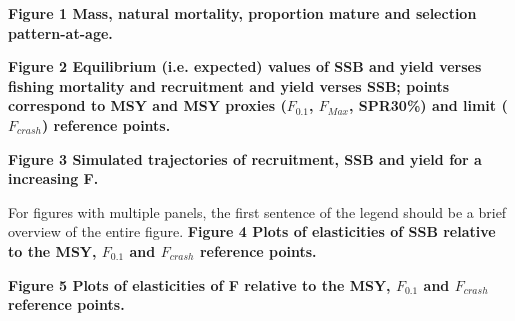\documentclass{pnastwo}
\begin{document}






\bf{Figure 1} Mass, natural mortality, proportion mature and selection pattern-at-age. \newline

\bf{Figure 2} Equilibrium (i.e. expected) values of SSB and yield verses fishing mortality and recruitment and yield verses SSB; points correspond to
MSY and MSY proxies ($F_{0.1}$, $F_{Max}$, SPR30\%) and limit ($F_{crash}$) reference points. \newline

\bf{Figure 3} Simulated trajectories of recruitment, SSB and yield for a increasing F. \newline

For figures with multiple panels, the first sentence of  the legend should be a brief overview of the entire figure.
\bf{Figure 4} Plots of elasticities of SSB relative to the MSY, $F_{0.1}$ and $F_{crash}$ reference points. \newline

\bf{Figure 5} Plots of elasticities of F relative to the MSY, $F_{0.1}$ and $F_{crash}$ reference points. \newline
\end{document}
